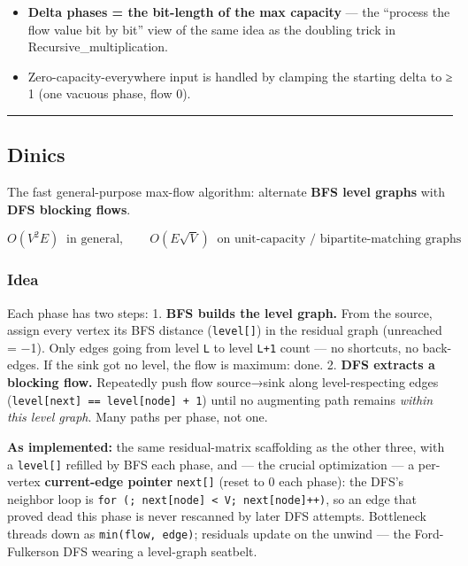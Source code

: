 \documentclass[
  10pt,
  letterpaper,
  onecolumn]{article}
\providecommand{\tightlist}{%
  \setlength{\itemsep}{0pt}\setlength{\parskip}{0pt}}
\begin{document}
\begin{itemize}
\tightlist
\item
  \textbf{Delta phases = the bit-length of the max capacity} --- the
  ``process the flow value bit by bit'' view of the same idea as the
  doubling trick in Recursive\_multiplication.
\item
  Zero-capacity-everywhere input is handled by clamping the starting
  delta to ≥ 1 (one vacuous phase, flow 0).
\end{itemize}

\begin{center}\rule{0.5\linewidth}{0.5pt}\end{center}

\hypertarget{dinics}{%
\subsection{Dinics}\label{dinics}}

The fast general-purpose max-flow algorithm: alternate \textbf{BFS level
graphs} with \textbf{DFS blocking flows}.

\begin{equation*}
O(V^2E)\ \text{ in general},
\qquad
O(E\sqrt{V})\ \text{ on unit-capacity / bipartite-matching graphs}
\end{equation*}

\hypertarget{idea-27}{%
\subsubsection{Idea}\label{idea-27}}

Each phase has two steps: 1. \textbf{BFS builds the level graph.} From
the source, assign every vertex its BFS distance (\texttt{level{[}{]}})
in the residual graph (unreached = −1). Only edges going from level
\texttt{L} to level \texttt{L+1} count --- no shortcuts, no back-edges.
If the sink got no level, the flow is maximum: done. 2. \textbf{DFS
extracts a blocking flow.} Repeatedly push flow source→sink along
level-respecting edges
(\texttt{level{[}next{]}\ ==\ level{[}node{]}\ +\ 1}) until no
augmenting path remains \emph{within this level graph}. Many paths per
phase, not one.

\textbf{As implemented:} the same residual-matrix scaffolding as the
other three, with a \texttt{level{[}{]}} refilled by BFS each phase, and
--- the crucial optimization --- a per-vertex \textbf{current-edge
pointer} \texttt{next{[}{]}} (reset to 0 each phase): the DFS's neighbor
loop is
\texttt{for\ (;\ next{[}node{]}\ \textless{}\ V;\ next{[}node{]}++)}, so
an edge that proved dead this phase is never rescanned by later DFS
attempts. Bottleneck threads down as \texttt{min(flow,\ edge)};
residuals update on the unwind --- the Ford-Fulkerson DFS wearing a
level-graph seatbelt.
\end{document}
